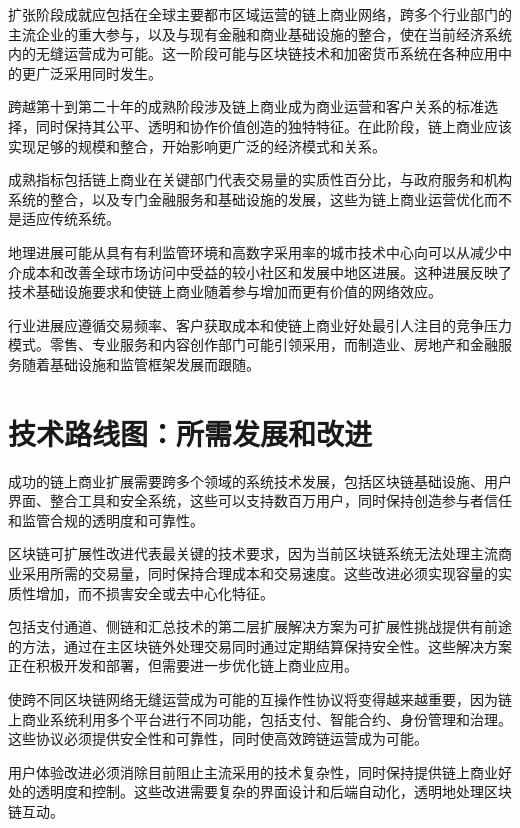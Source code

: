 \documentclass[
  Letterpaper,
]{scrbook}
\begin{document}
扩张阶段成就应包括在全球主要都市区域运营的链上商业网络，跨多个行业部门的主流企业的重大参与，以及与现有金融和商业基础设施的整合，使在当前经济系统内的无缝运营成为可能。这一阶段可能与区块链技术和加密货币系统在各种应用中的更广泛采用同时发生。

跨越第十到第二十年的成熟阶段涉及链上商业成为商业运营和客户关系的标准选择，同时保持其公平、透明和协作价值创造的独特特征。在此阶段，链上商业应该实现足够的规模和整合，开始影响更广泛的经济模式和关系。

成熟指标包括链上商业在关键部门代表交易量的实质性百分比，与政府服务和机构系统的整合，以及专门金融服务和基础设施的发展，这些为链上商业运营优化而不是适应传统系统。

地理进展可能从具有有利监管环境和高数字采用率的城市技术中心向可以从减少中介成本和改善全球市场访问中受益的较小社区和发展中地区进展。这种进展反映了技术基础设施要求和使链上商业随着参与增加而更有价值的网络效应。

行业进展应遵循交易频率、客户获取成本和使链上商业好处最引人注目的竞争压力模式。零售、专业服务和内容创作部门可能引领采用，而制造业、房地产和金融服务随着基础设施和监管框架发展而跟随。

\section{技术路线图：所需发展和改进}\label{ux6280ux672fux8defux7ebfux56feux6240ux9700ux53d1ux5c55ux548cux6539ux8fdb}

成功的链上商业扩展需要跨多个领域的系统技术发展，包括区块链基础设施、用户界面、整合工具和安全系统，这些可以支持数百万用户，同时保持创造参与者信任和监管合规的透明度和可靠性。

区块链可扩展性改进代表最关键的技术要求，因为当前区块链系统无法处理主流商业采用所需的交易量，同时保持合理成本和交易速度。这些改进必须实现容量的实质性增加，而不损害安全或去中心化特征。

包括支付通道、侧链和汇总技术的第二层扩展解决方案为可扩展性挑战提供有前途的方法，通过在主区块链外处理交易同时通过定期结算保持安全性。这些解决方案正在积极开发和部署，但需要进一步优化链上商业应用。

使跨不同区块链网络无缝运营成为可能的互操作性协议将变得越来越重要，因为链上商业系统利用多个平台进行不同功能，包括支付、智能合约、身份管理和治理。这些协议必须提供安全性和可靠性，同时使高效跨链运营成为可能。

用户体验改进必须消除目前阻止主流采用的技术复杂性，同时保持提供链上商业好处的透明度和控制。这些改进需要复杂的界面设计和后端自动化，透明地处理区块链互动。
\end{document}
